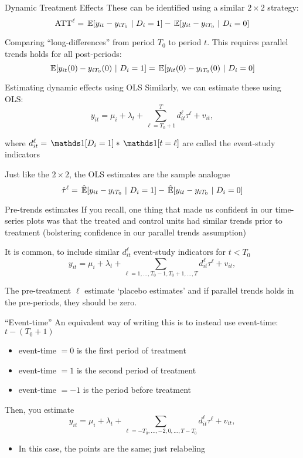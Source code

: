 \documentclass[aspectratio=169,t,11pt,table]{beamer}
\begin{document}
\begin{frame}{Dynamic Treatment Effects}
  These can be identified using a similar $2 \times 2$ strategy:
  $$
    \text{ATT}^\ell = \expec{y_{it} - y_{iT_0}}{D_i = 1} - \expec{y_{it} - y_{iT_0}}{D_i = 0}
  $$

  \bigskip
  Comparing ``long-differences'' from period $T_0$ to period $t$. This requires parallel trends holds for all post-periods:
  $$
    \expec{y_{it}(0) - y_{iT_0}(0)}{D_i = 1} = \expec{y_{it}(0) - y_{iT_0}(0)}{D_i = 0}
  $$
\end{frame}

\begin{frame}{Estimating dynamic effects using OLS}
  Similarly, we can estimate these using OLS:
  $$
    y_{it} = \mu_i + \lambda_t + \sum_{\ell = T_0 + 1}^T d_{it}^\ell \tau^\ell + v_{it},
  $$
  
  where $d_{it}^\ell = \one{D_i = 1} * \one{t = \ell}$ are called the \alert{event-study indicators}

  \bigskip
  Just like the $2 \times 2$, the OLS estimates are the sample analogue 
  $$
    \hat{\tau}^{\ell} = \expechat{y_{it} - y_{iT_0}}{D_i = 1} - \expechat{y_{it} - y_{iT_0}}{D_i = 0}
  $$ 
\end{frame}

\begin{frame}{Pre-trends estimates}
  If you recall, one thing that made us confident in our time-series plots was that the treated and control units had similar trends prior to treatment (bolstering confidence in our parallel trends assumption)

  \pause
  \bigskip
  It is common, to include similar $d_{it}^\ell$ event-study indicators for $t < T_0$
  $$
    y_{it} = \mu_i + \lambda_t + \sum_{\ell = 1, \dots, T_0 - 1, T_0 + 1, \dots, T} d_{it}^\ell \tau^\ell + v_{it},
  $$
  
  The pre-treatment $\ell$ estimate `placebo estimates' and if parallel trends holds in the pre-periods, they should be zero.
\end{frame}

\begin{frame}{``Event-time''}
  An equivalent way of writing this is to instead use event-time: $t - (T_0 + 1)$
  \begin{itemize}
    \item event-time $= 0$ is the first period of treatment
    \item event-time $= 1$ is the second period of treatment
    \item event-time $= -1$ is the period before treatment
  \end{itemize}

  \bigskip
  Then, you estimate 
  $$
    y_{it} = \mu_i + \lambda_t + \sum_{\ell = -T_0, \dots, -2, 0, \dots, T - T_0} d_{it}^\ell \tau^\ell + v_{it},
  $$
  
  \begin{itemize}
    \item In this case, the points are the same; just relabeling
  \end{itemize}
\end{frame}
\end{document}
